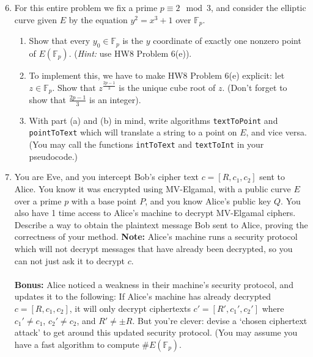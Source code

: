 \documentclass[11pt]{article}
\newcommand{\bF}{\mathbb{F}}
\begin{document}
\begin{enumerate}
\setcounter{enumi}{5}
  \item{
    For this entire problem we fix a prime $p\equiv2\mod 3$, and consider the elliptic curve given $E$ by the equation $y^2=x^3+1$ over $\bF_p$.
    \begin{enumerate}
    \item{Show that every $y_0\in\bF_p$ is the $y$ coordinate of exactly one nonzero point of $E(\bF_p)$.  (\textit{Hint:} use HW8 Problem 6(e)).}
    \item{To implement this, we have to make HW8 Problem 6(e) explicit: let $z\in\bF_p$.  Show that $z^{\frac{2p-1}{3}}$ is the unique cube root of $z$.  (Don't forget to show that $\frac{2p-1}{3}$ is an integer).}
    \item{With part (a) and (b) in mind, write algorithms \verb|textToPoint| and \verb|pointToText| which will translate a string to a point on $E$, and vice versa.  (You may call the functions \verb|intToText| and \verb|textToInt| in your pseudocode.)}
    \end{enumerate}
}
  \item{
  You are Eve, and you intercept Bob's cipher text $c = [R,c_1,c_2]$ sent to Alice.  You know it was encrypted using MV-Elgamal, with a public curve $E$ over a prime $p$ with a base point $P$, and you know Alice's public key $Q$.  You also have 1 time access to Alice's machine to decrypt MV-Elgamal ciphers.  Describe a way to obtain the plaintext message Bob sent to Alice, proving the correctness of your method.  \textbf{Note:} Alice's machine runs a security protocol which will not decrypt messages that have already been decrypted, so you can not just ask it to decrypt $c$.\\
  \\
  \textbf{Bonus: }Alice noticed a weakness in their machine's security protocol, and updates it to the following: If Alice's machine has already decrypted $c = [R,c_1,c_2]$, it will only decrypt ciphertexts $c' = [R',c_1',c_2']$ where $c_1'\not=c_1$, $c_2'\not=c_2$, and $R'\not=\pm R$.  But you're clever: devise a `chosen ciphertext attack' to get around this updated security protocol.  (You may assume you have a fast algorithm to compute $\#E(\bF_p)$.
  }
\end{enumerate}
\end{document}
